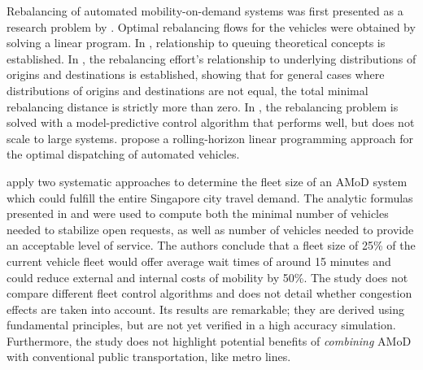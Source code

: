 Rebalancing of automated mobility-on-demand systems was first presented as a research  problem by \citet{pavone2011load}. Optimal rebalancing flows for the vehicles were obtained by solving a linear program. In \citep{zhang2016control}, relationship to queuing theoretical concepts is established. In \citep{treleaven2011asymptotically}, the rebalancing effort’s relationship to underlying distributions of origins and destinations is established, showing that for general cases where distributions of origins and destinations are not equal, the total minimal rebalancing distance is strictly more than zero. In \citep{zhang2016model}, the rebalancing problem is solved with a model-predictive control algorithm that performs well, but does not scale to large systems. \citet{MA2017124} propose a rolling-horizon linear programming approach for the optimal dispatching of automated vehicles.


\citet{spieser2014toward} apply two systematic approaches to determine the fleet size of an AMoD system which could fulfill the entire Singapore city travel demand. The analytic formulas presented in \citep{zhang2016control} and \citep{treleaven2011asymptotically} were used to compute both the minimal number of vehicles needed to stabilize open requests, as well as number of vehicles needed to provide an acceptable level of service.  The authors conclude that a fleet size of 25\% of the current vehicle fleet would offer average wait times of around 15 minutes and could reduce external and internal costs of mobility by 50\%.  The study does not compare different fleet control algorithms and does not detail whether congestion effects are taken into account. Its results are remarkable; they are derived using fundamental principles, but are not yet verified in a high accuracy simulation. Furthermore, the study does not highlight potential benefits of \textit{combining} AMoD with conventional public transportation, like metro lines.

